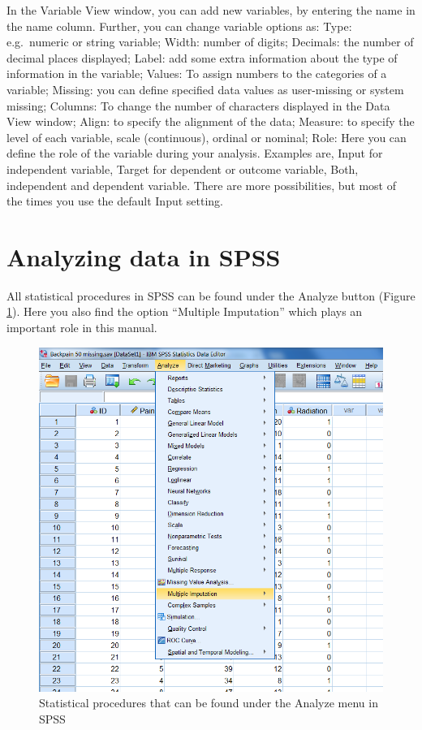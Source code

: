 \documentclass[
]{book}
\begin{document}
In the Variable View window, you can add new variables, by entering the name in the name column. Further, you can change variable options as: Type: e.g.~numeric or string variable; Width: number of digits; Decimals: the number of decimal places displayed; Label: add some extra information about the type of information in the variable; Values: To assign numbers to the categories of a variable; Missing: you can define specified data values as user-missing or system missing; Columns: To change the number of characters displayed in the Data View window; Align: to specify the alignment of the data; Measure: to specify the level of each variable, scale (continuous), ordinal or nominal; Role: Here you can define the role of the variable during your analysis. Examples are, Input for independent variable, Target for dependent or outcome variable, Both, independent and dependent variable. There are more possibilities, but most of the times you use the default Input setting.

\hypertarget{analyzing-data-in-spss}{%
\section{Analyzing data in SPSS}\label{analyzing-data-in-spss}}

All statistical procedures in SPSS can be found under the Analyze button (Figure \ref{fig:fig4}). Here you also find the option ``Multiple Imputation'' which plays an important role in this manual.

\begin{figure}

{\centering \includegraphics[width=0.95\linewidth]{images/fig1.4} 

}

\caption{Statistical procedures that can be found under the Analyze menu in SPSS}\label{fig:fig4}
\end{figure}
\end{document}
